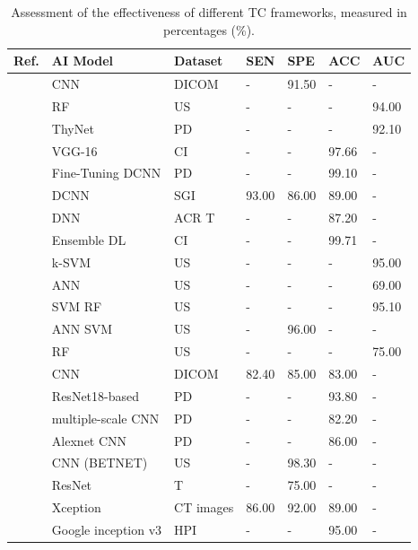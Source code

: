 \documentclass[a4paper,fleqn]{cas-sc}
\begin{document}
\begin{table}[t!]
\caption{Assessment of the effectiveness of different TC frameworks, measured in percentages (\%).}
\label{tab8}
\scriptsize
\begin{tabular}{
m{6mm}
m{30mm}
m{35mm}
m{12mm}
m{12mm}
m{12mm}
m{12mm}
}
\hline
Ref. &  AI Model & Dataset & SEN & SPE & ACC & AUC\\
\hline
\cite{ma2017ultrasound} & CNN & DICOM & - & 91.50 & - & - \\
\cite{zhang2019machine} & \ac{RF} & US  & - & - & - & 94.00 \\
\cite{peng2021deep} & ThyNet & PD & - & - & - & 92.10 \\
\cite{guan2019deep} & VGG-16 & CI & - & - & 97.66 & - \\
\cite{chi2017thyroid} & Fine-Tuning DCNN & PD & - & - & 99.10 & - \\
\cite{li2019diagnosis} & DCNN &SGI & 93.00 & 86.00 & 89.00 & - \\
\cite{zhu2019deep} & \ac{DNN} & ACR T & - & - & 87.20 & - \\
\cite{duc2022ensemble} & Ensemble \ac{DL} & CI & - & - & 99.71 & - \\
\cite{ouyang2019comparison} & k-SVM & US & - & - & - & 95.00\\
\cite{shin2020application} & \ac{ANN} & US & - & - & - & 69.00 \\
\cite{zhao2021comparative} & \ac{SVM} \ac{RF} & US & - & - & - & 95.10 \\
\cite{vadhiraj2021ultrasound} & \ac{ANN} \ac{SVM} & US & - & 96.00 & - & - \\
\cite{gild2022risk} & \ac{RF} & US & - & - & - & 75.00 \\
\cite{ma2017pre} & CNN & DICOM & 82.40 & 85.00 & 83.00 & - \\
\cite{zhu2017image} & ResNet18-based &  PD& - & - & 93.80 & - \\
\cite{gao2018computer} & multiple-scale CNN & PD & - & - & 82.20 & - \\
\cite{zuo2018extraction} & Alexnet CNN & PD & - & - & 86.00 & - \\
\cite{zhu2021efficient} & CNN (BETNET) & US & - & 98.30 & - & - \\
\cite{kim2022deep} & ResNet & T & - & 75.00 & - & - \\
\cite{lee2019application} & Xception & CT images & 86.00 & 92.00 & 89.00 & - \\
\cite{tsou2019mapping} & Google inception v3 & HPI & - & - & 95.00 & - \\

\end{tabular}
\end{table}
\end{document}
